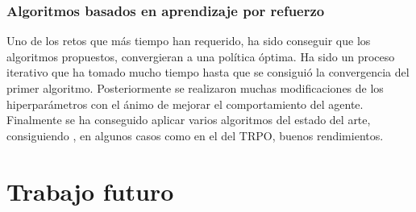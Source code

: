 \subsubsection{Algoritmos basados en aprendizaje por refuerzo}

Uno de los retos que más tiempo han requerido, ha sido conseguir que los algoritmos propuestos, convergieran a una política óptima. Ha sido un proceso iterativo que ha tomado mucho tiempo hasta que se consiguió la convergencia del primer algoritmo. Posteriormente se realizaron muchas modificaciones de los hiperparámetros con el ánimo de mejorar el comportamiento del agente. Finalmente se ha conseguido aplicar varios algoritmos del estado del arte, consiguiendo , en algunos casos como en el del TRPO, buenos rendimientos.


\section{Trabajo futuro}

	